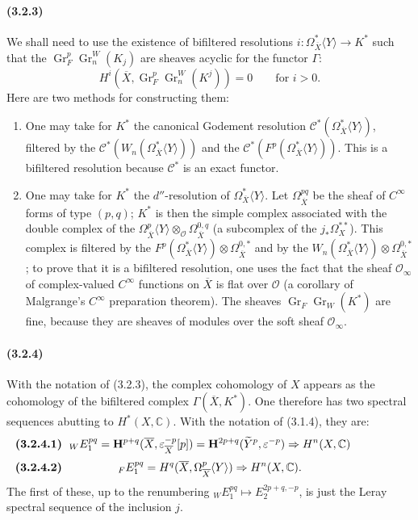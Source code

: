 \documentclass[10pt]{article}
\newcommand{\C}{\mathbb C}
\newcommand{\Gr}{\operatorname{Gr}}
\begin{document}
\paragraph{(3.2.3)} We shall need to use the existence of bifiltered resolutions $i:\Omega_{\overline X}^{*}\langle Y\rangle\longrightarrow K^*$ such that the $\Gr_F^p\Gr_n^W(K_j)$ are sheaves acyclic for the functor $\Gamma$:
\[
H^i(\overline X,\Gr_F^p\Gr_n^W(K^j))=0\qquad \text{for }i>0.
\]
Here are two methods for constructing them:
\begin{enumerate}[label=\textit{\alph*)}]
\item One may take for $K^*$ the canonical Godement resolution $\mathcal C^*(\Omega_{\overline X}^{*}\langle Y\rangle)$, filtered by the $\mathcal C^*(W_n(\Omega_{\overline X}^{*}\langle Y\rangle))$ and the $\mathcal C^*(F^p(\Omega_{\overline X}^{*}\langle Y\rangle))$. This is a bifiltered resolution because $\mathcal C^*$ is an exact functor.
\item One may take for $K^*$ the $d''$-resolution of $\Omega_{\overline X}^{*}\langle Y\rangle$. Let $\Omega_{\overline X}^{pq}$ be the sheaf of $C^\infty$ forms of type $(p,q)$; $K^*$ is then the simple complex associated with the double complex of the $\Omega_{\overline X}^{p}\langle Y\rangle\otimes_{\mathcal O}\Omega_{\overline X}^{0,q}$ (a subcomplex of the $j_*\Omega_X^{**}$). This complex is filtered by the $F^p(\Omega_{\overline X}^{*}\langle Y\rangle)\otimes\Omega_{\overline X}^{0,*}$ and by the $W_n(\Omega_{\overline X}^{*}\langle Y\rangle)\otimes\Omega_{\overline X}^{0,*}$; to prove that it is a bifiltered resolution, one uses the fact that the sheaf $\mathcal O_\infty$ of complex-valued $C^\infty$ functions on $\overline X$ is flat over $\mathcal O$ (a corollary of Malgrange's $C^\infty$ preparation theorem). The sheaves $\Gr_F\Gr_W(K^*)$ are fine, because they are sheaves of modules over the soft sheaf $\mathcal O_\infty$.
\end{enumerate}

\paragraph{(3.2.4)} With the notation of (3.2.3), the complex cohomology of $X$ appears as the cohomology of the bifiltered complex $\Gamma(\overline X,K^*)$. One therefore has two spectral sequences abutting to $H^*(X,\C)$. With the notation of (3.1.4), they are:
\[
\makebox[\textwidth][s]{\textbf{(3.2.4.1)}\hfill$\displaystyle {}_W E_1^{pq}=\mathbf H^{p+q}(\overline X,\varepsilon_{\overline X}^{-p}[p])=\mathbf H^{2p+q}(\widetilde Y^p,\varepsilon^{-p})\Rightarrow H^n(X,\C)$\hfill\phantom{\textbf{(3.2.4.1)}}}
\]
\[
\makebox[\textwidth][s]{\textbf{(3.2.4.2)}\hfill$\displaystyle {}_F E_1^{pq}=H^q(\overline X,\Omega_{\overline X}^p\langle Y\rangle)\Rightarrow H^n(X,\C).$\hfill\phantom{\textbf{(3.2.4.2)}}}
\]
The first of these, up to the renumbering ${}_W E_1^{pq}\mapsto E_2^{2p+q,-p}$, is just the Leray spectral sequence of the inclusion $j$.
\end{document}
